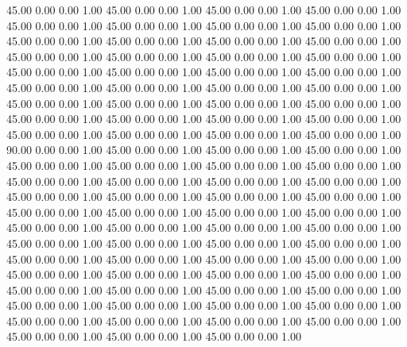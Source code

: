    45.00   0.00   0.00   1.00
   45.00   0.00   0.00   1.00
   45.00   0.00   0.00   1.00
   45.00   0.00   0.00   1.00
   45.00   0.00   0.00   1.00
   45.00   0.00   0.00   1.00
   45.00   0.00   0.00   1.00
   45.00   0.00   0.00   1.00
   45.00   0.00   0.00   1.00
   45.00   0.00   0.00   1.00
   45.00   0.00   0.00   1.00
   45.00   0.00   0.00   1.00
   45.00   0.00   0.00   1.00
   45.00   0.00   0.00   1.00
   45.00   0.00   0.00   1.00
   45.00   0.00   0.00   1.00
   45.00   0.00   0.00   1.00
   45.00   0.00   0.00   1.00
   45.00   0.00   0.00   1.00
   45.00   0.00   0.00   1.00
   45.00   0.00   0.00   1.00
   45.00   0.00   0.00   1.00
   45.00   0.00   0.00   1.00
   45.00   0.00   0.00   1.00
   45.00   0.00   0.00   1.00
   45.00   0.00   0.00   1.00
   45.00   0.00   0.00   1.00
   45.00   0.00   0.00   1.00
   45.00   0.00   0.00   1.00
   45.00   0.00   0.00   1.00
   45.00   0.00   0.00   1.00
   45.00   0.00   0.00   1.00
   45.00   0.00   0.00   1.00
   45.00   0.00   0.00   1.00
   45.00   0.00   0.00   1.00
   45.00   0.00   0.00   1.00
   90.00   0.00   0.00   1.00
   45.00   0.00   0.00   1.00
   45.00   0.00   0.00   1.00
   45.00   0.00   0.00   1.00
   45.00   0.00   0.00   1.00
   45.00   0.00   0.00   1.00
   45.00   0.00   0.00   1.00
   45.00   0.00   0.00   1.00
   45.00   0.00   0.00   1.00
   45.00   0.00   0.00   1.00
   45.00   0.00   0.00   1.00
   45.00   0.00   0.00   1.00
   45.00   0.00   0.00   1.00
   45.00   0.00   0.00   1.00
   45.00   0.00   0.00   1.00
   45.00   0.00   0.00   1.00
   45.00   0.00   0.00   1.00
   45.00   0.00   0.00   1.00
   45.00   0.00   0.00   1.00
   45.00   0.00   0.00   1.00
   45.00   0.00   0.00   1.00
   45.00   0.00   0.00   1.00
   45.00   0.00   0.00   1.00
   45.00   0.00   0.00   1.00
   45.00   0.00   0.00   1.00
   45.00   0.00   0.00   1.00
   45.00   0.00   0.00   1.00
   45.00   0.00   0.00   1.00
   45.00   0.00   0.00   1.00
   45.00   0.00   0.00   1.00
   45.00   0.00   0.00   1.00
   45.00   0.00   0.00   1.00
   45.00   0.00   0.00   1.00
   45.00   0.00   0.00   1.00
   45.00   0.00   0.00   1.00
   45.00   0.00   0.00   1.00
   45.00   0.00   0.00   1.00
   45.00   0.00   0.00   1.00
   45.00   0.00   0.00   1.00
   45.00   0.00   0.00   1.00
   45.00   0.00   0.00   1.00
   45.00   0.00   0.00   1.00
   45.00   0.00   0.00   1.00
   45.00   0.00   0.00   1.00
   45.00   0.00   0.00   1.00
   45.00   0.00   0.00   1.00
   45.00   0.00   0.00   1.00
   45.00   0.00   0.00   1.00
   45.00   0.00   0.00   1.00
   45.00   0.00   0.00   1.00
   45.00   0.00   0.00   1.00
